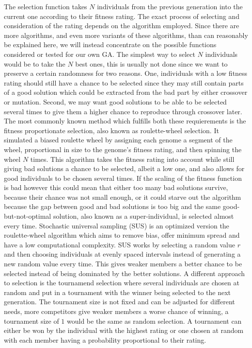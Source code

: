 The selection function takes $N$ individuals from the previous generation into the current one according to their fitness rating. The exact process of selecting and consideration of the rating depends on the algorithm employed. Since there are more algorithms, and even more variants of these algorithms, than can reasonably be explained here, we will instead concentrate on the possible functions considered or tested for our own GA. The simplest way to select $N$ individuals would be to take the $N$ best ones, this is usually not done since we want to preserve a certain randomness for two reasons. One, individuals with a low fitness rating should still have a chance to be selected since they may still contain parts of a good solution which could be extracted from the bad part by either crossover or mutation. Second, we may want good solutions to be able to be selected several times to give them a higher chance to reproduce through crossover later. The most commonly known method which fulfills both these requierements is the fitness proportionate selection\cite{16}, also known as roulette-wheel selection. It simulated a biased roulette wheel by assigning each genome a segment of the wheel, proportional in size to the genome's fitness rating, and then spinning the wheel $N$ times. This algorithm takes the fitness rating into account while still giving bad solutions a chance to be selected, albeit a low one, and also allows for good individuals to be chosen several times.  If the scaling of the fitness function is bad however this could mean that either too many bad solutions survive, because their chance was not small enough, or it could starve out the algorithm because the gap between good and bad solutions is too big and the same good-but-not-optimal solution, also known as a super-individual, is selected almost every time. Stochastic universal sampling (SUS) is an optimized version the roulette-wheel algorithm which aims to remove bias, offer minimum spread and have a low computational complexity. SUS works by selecting a random value $r$ and then choosing individuals at evenly spaced intervals instead of generating a new random value every time. This gives weaker members a better chance to be selected instead of being dominated by the better solutions.\cite{17} A different approach to selection is the tournamend selection where several individuals are chosen at random and put in a tournament with the winner being selected to the next generation. The tournament size is not fixed and can be adjusted for different needs, more competitors give weaker members a worse chance of winning, a tournament size of $1$ would be the same as random selection. A tournament can either be won by the individual with the highest rating or one chosen at random with each member having a probability proportional to their rating.

